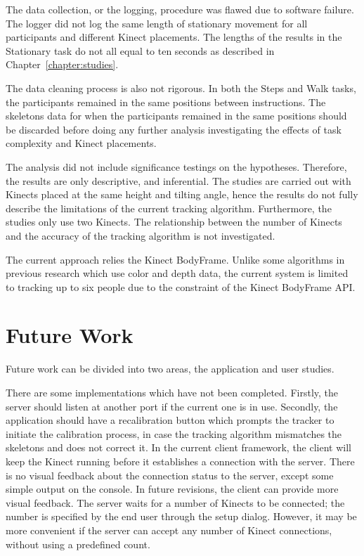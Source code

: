 The data collection, or the logging, procedure was flawed due to software failure. The logger did not log the same length of stationary movement for all participants and different Kinect placements. The lengths of the results in the Stationary task do not all equal to ten seconds as described in Chapter~\ref{chapter:studies}.

The data cleaning process is also not rigorous. In both the Steps and Walk tasks, the participants remained in the same positions between instructions. The skeletons data for when the participants remained in the same positions should be discarded before doing any further analysis investigating the effects of task complexity and Kinect placements.

The analysis did not include significance testings on the hypotheses. Therefore, the results are only descriptive, and inferential. The studies are carried out with Kinects placed at the same height and tilting angle, hence the results do not fully describe the limitations of the current tracking algorithm. Furthermore, the studies only use two Kinects. The relationship between the number of Kinects and the accuracy of the tracking algorithm is not investigated.

The current approach relies the Kinect BodyFrame. Unlike some algorithms in previous research which use color and depth data, the current system is limited to tracking up to six people due to the constraint of the Kinect BodyFrame API.

\section{Future Work}
\label{sec:discussion_future_Work}

Future work can be divided into two areas, the application and user studies.

There are some implementations which have not been completed. Firstly, the server should listen at another port if the current one is in use. Secondly, the application should have a recalibration button which prompts the tracker to initiate the calibration process, in case the tracking algorithm mismatches the skeletons and does not correct it. In the current client framework, the client will keep the Kinect running before it establishes a connection with the server. There is no visual feedback about the connection status to the server, except some simple output on the console. In future revisions, the client can provide more visual feedback. The server waits for a number of Kinects to be connected; the number is specified by the end user through the setup dialog. However, it may be more convenient if the server can accept any number of Kinect connections, without using a predefined count.

